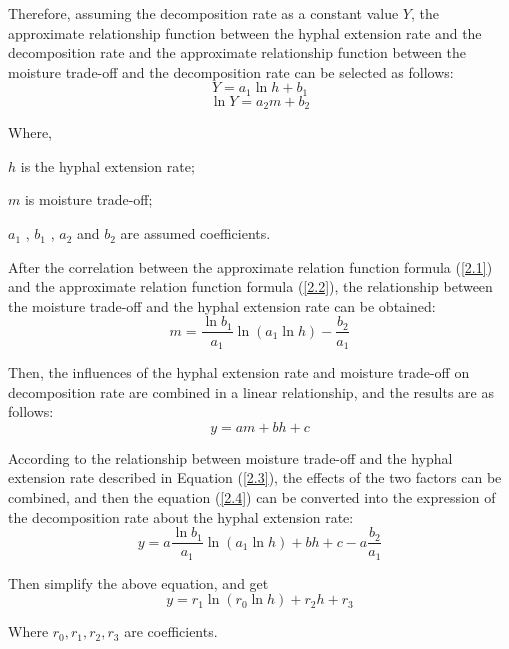 Therefore, assuming the decomposition rate as a constant value $Y$, the approximate relationship function between the hyphal extension rate and the decomposition rate and the approximate relationship function between the moisture trade-off and the decomposition rate can be selected as follows:
\begin{equation}\label{2.1}
    Y=a_{1}\ln{h}+b_{1}
\end{equation}
\begin{equation}\label{2.2}
    \ln{Y}=a_{2}m+b_{2}
\end{equation}

Where,

$h$ is the hyphal extension rate;

$m$ is moisture trade-off;

$a_{1}$ , $b_{1}$ , $a_{2}$ and $b_{2}$ are assumed coefficients.

After the correlation between the approximate relation function formula (\ref{2.1}) and the approximate relation function formula (\ref{2.2}), the relationship between the moisture trade-off and the hyphal extension rate can be obtained:
\begin{equation}\label{2.3}
    m=\frac{\ln{b_{1}}}{a_{1}}\ln{(a_{1}\ln{h})}-\frac{b_{2}}{a_{1}} 
\end{equation}

Then, the influences of the hyphal extension rate and moisture trade-off on decomposition rate are combined in a linear relationship, and the results are as follows:
\begin{equation}\label{2.4}
    y=am+bh+c 
\end{equation}

According to the relationship between moisture trade-off and the hyphal extension rate described in Equation (\ref{2.3}), the effects of the two factors can be combined, and then the equation (\ref{2.4}) can be converted into the expression of the decomposition rate about the hyphal extension rate:
\begin{equation}\label{}
    y=a\frac{\ln{b_{1}}}{a_{1}}\ln{(a_{1}\ln{h})}+bh+c-a\frac{b_{2}}{a_{1}} 
\end{equation}

Then simplify the above equation, and get
\begin{equation}\label{}
    y=r_{1}\ln{(r_{0}\ln{h})}+r_{2}h+r_{3}
\end{equation}

Where $r_{0},r_{1},r_{2},r_{3}$ are coefficients.

